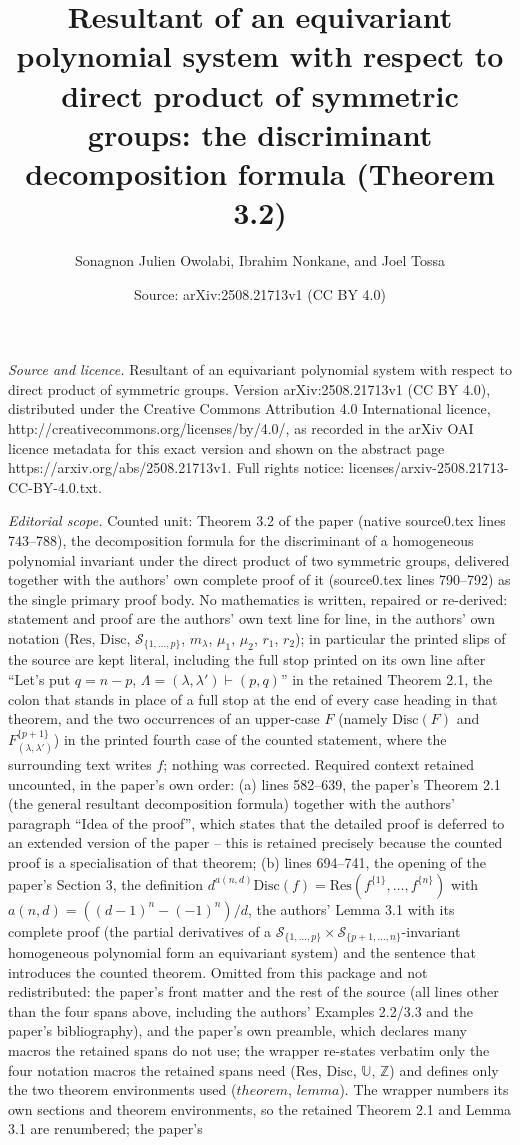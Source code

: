 \documentclass[10pt,a4paper]{amsart}
\title[Theorem 3.2 of arXiv:2508.21713]{Resultant of an equivariant polynomial system with respect to direct product of symmetric groups: the discriminant decomposition formula (Theorem 3.2)}
\author{Sonagnon Julien Owolabi, Ibrahim Nonkane, and Joel Tossa}
\date{Source: arXiv:2508.21713v1 (CC BY 4.0)}
\newcommand{\Res}{\mathrm{Res}}
\newcommand{\Disc}{\mathrm{Disc}}
\newcommand{\UU}{\mathbb{U}}
\newcommand{\ZZ}{\mathbb{Z}}
\begin{document}
\maketitle
\noindent\emph{Source and licence.} Resultant of an equivariant polynomial system with respect to direct product of symmetric groups. Version arXiv:2508.21713v1 (CC BY 4.0), distributed under the Creative Commons Attribution 4.0 International licence, http://creativecommons.org/licenses/by/4.0/, as recorded in the arXiv OAI licence metadata for this exact version and shown on the abstract page https://arxiv.org/abs/2508.21713v1. Full rights notice: licenses/arxiv-2508.21713-CC-BY-4.0.txt.\par\smallskip
\noindent\textit{Editorial scope.} Counted unit: Theorem 3.2 of the paper (native source0.tex lines 743--788), the decomposition formula for the discriminant of a homogeneous polynomial invariant under the direct product of two symmetric groups, delivered together with the authors' own complete proof of it (source0.tex lines 790--792) as the single primary proof body. No mathematics is written, repaired or re-derived: statement and proof are the authors' own text line for line, in the authors' own notation ($\Res$, $\Disc$, $\mathcal{S}_{\{1,\ldots,p\}}$, $m_\lambda$, $\mu_1$, $\mu_2$, $r_1$, $r_2$); in particular the printed slips of the source are kept literal, including the full stop printed on its own line after ``Let's put $q=n-p$, $\Lambda=(\lambda,\lambda')\vdash(p,q)$'' in the retained Theorem 2.1, the colon that stands in place of a full stop at the end of every case heading in that theorem, and the two occurrences of an upper-case $F$ (namely $\Disc(F)$ and $F_{(\lambda,\lambda')}^{\{p+1\}}$) in the printed fourth case of the counted statement, where the surrounding text writes $f$; nothing was corrected. Required context retained uncounted, in the paper's own order: (a) lines 582--639, the paper's Theorem 2.1 (the general resultant decomposition formula) together with the authors' paragraph ``Idea of the proof'', which states that the detailed proof is deferred to an extended version of the paper -- this is retained precisely because the counted proof is a specialisation of that theorem; (b) lines 694--741, the opening of the paper's Section 3, the definition $d^{a(n,d)}\Disc(f)=\Res(f^{\{1\}},\ldots,f^{\{n\}})$ with $a(n,d)=((d-1)^n-(-1)^n)/d$, the authors' Lemma 3.1 with its complete proof (the partial derivatives of a $\mathcal{S}_{\{1,\ldots,p\}}\times\mathcal{S}_{\{p+1,\ldots,n\}}$-invariant homogeneous polynomial form an equivariant system) and the sentence that introduces the counted theorem. Omitted from this package and not redistributed: the paper's front matter and the rest of the source (all lines other than the four spans above, including the authors' Examples 2.2/3.3 and the paper's bibliography), and the paper's own preamble, which declares many macros the retained spans do not use; the wrapper re-states verbatim only the four notation macros the retained spans need ($\Res$, $\Disc$, $\UU$, $\ZZ$) and defines only the two theorem environments used ($theorem$, $lemma$). The wrapper numbers its own sections and theorem environments, so the retained Theorem 2.1 and Lemma 3.1 are renumbered; the paper's 
\end{document}
